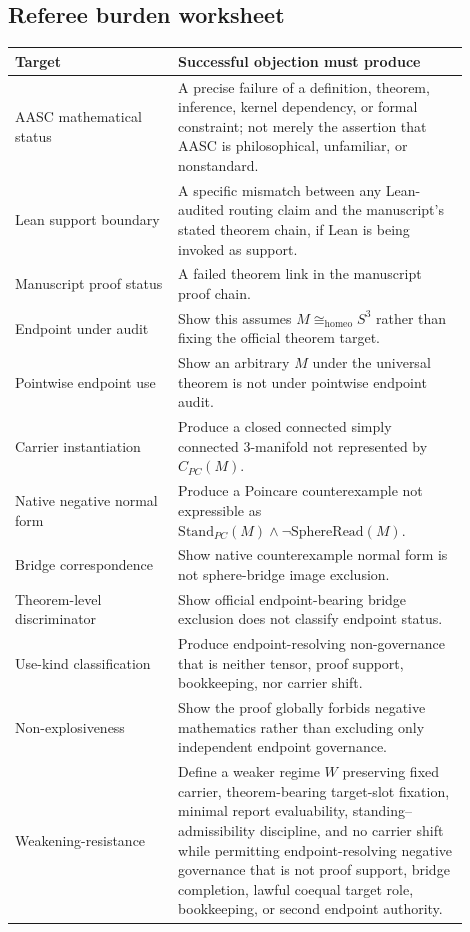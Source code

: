 \documentclass[11pt]{article}
\newcommand{\Sthree}{S^{3}}
\newcommand{\StandPC}{\mathrm{Stand}_{PC}}
\newcommand{\SphereRead}{\mathrm{SphereRead}}
\newcommand{\CarrierPC}{C_{PC}}
\newcommand{\Homeo}{\cong_{\mathrm{homeo}}}
\begin{document}
\subsection{Referee burden worksheet}
\begin{longtable}{L{0.32\linewidth}L{0.58\linewidth}}
\toprule
\textbf{Target} & \textbf{Successful objection must produce}\\
\midrule
AASC mathematical status & A precise failure of a definition, theorem, inference, kernel dependency, or formal constraint; not merely the assertion that AASC is philosophical, unfamiliar, or nonstandard.\\
Lean support boundary & A specific mismatch between any Lean-audited routing claim and the manuscript's stated theorem chain, if Lean is being invoked as support.\\
Manuscript proof status & A failed theorem link in the manuscript proof chain.\\
Endpoint under audit & Show this assumes \(M\Homeo\Sthree\) rather than fixing the official theorem target.\\
Pointwise endpoint use & Show an arbitrary \(M\) under the universal theorem is not under pointwise endpoint audit.\\
Carrier instantiation & Produce a closed connected simply connected 3-manifold not represented by \(\CarrierPC(M)\).\\
Native negative normal form & Produce a Poincare counterexample not expressible as \(\StandPC(M)\wedge\neg\SphereRead(M)\).\\
Bridge correspondence & Show native counterexample normal form is not sphere-bridge image exclusion.\\
Theorem-level discriminator & Show official endpoint-bearing bridge exclusion does not classify endpoint status.\\
Use-kind classification & Produce endpoint-resolving non-governance that is neither tensor, proof support, bookkeeping, nor carrier shift.\\
Non-explosiveness & Show the proof globally forbids negative mathematics rather than excluding only independent endpoint governance.\\
Weakening-resistance & Define a weaker regime \(W\) preserving fixed carrier, theorem-bearing target-slot fixation, minimal report evaluability, standing--admissibility discipline, and no carrier shift while permitting endpoint-resolving negative governance that is not proof support, bridge completion, lawful coequal target role, bookkeeping, or second endpoint authority.\\

\end{longtable}
\end{document}
